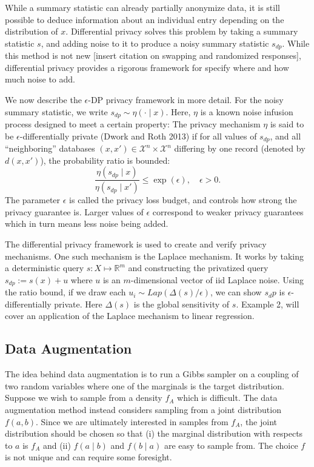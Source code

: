 While a summary statistic can already partially anonymize data, it is still
possible to deduce information about an individual entry depending on
the distribution of \(x\). Differential privacy
solves this problem by taking a summary statistic \(s\), and adding noise to it to produce a noisy summary statistic \(s_{dp}\).
While this method is not new {[}insert citation on swapping and randomized responses{]}, differential privacy
provides a rigorous framework for specify where and how much
noise to add.

We now describe the \(\epsilon\)-DP privacy framework in more detail. For the noisy summary
statistic, we write \(s_{dp} \sim \eta(\cdot \mid x)\). Here,
\(\eta\) is a known noise infusion process designed to meet a certain property: The privacy mechanism
\(\eta\) is said to be \(\epsilon\)-differentially private (Dwork and Roth 2013) if for all values of
\(s_{dp}\), and all ``neighboring'' databases \((x,x') \in \mathcal{X}^n \times \mathcal{X}^n\) differing
by one record (denoted by \(d(x,x')\)), the probability ratio is bounded:
\[
\dfrac{\eta(s_{dp} \mid x)}{\eta(s_{dp} \mid x')} \leq \exp(\epsilon), \quad \epsilon > 0.
\]
The parameter \(\epsilon\) is called the privacy loss budget, and controls how
strong the privacy guarantee is. Larger values of \(\epsilon\) correspond to weaker
privacy guarantees which in turn means less noise being added.

The differential privacy framework is used to create and verify privacy
mechanisms. One such mechanism is the Laplace mechanism. It works by
taking a deterministic query \(s: X \mapsto \mathbb{R}^m\) and constructing
the privatized query \(s_{dp} := s(x) + u\) where \(u\) is an \(m\)-dimensional
vector of iid Laplace noise. Using the ratio bound, if we draw
each \(u_i \sim Lap(\Delta (s) / \epsilon)\), we can show \(s_dp\) is \(\epsilon\)-differentially private.
Here \(\Delta (s)\) is the global sensitivity of \(s\). Example 2, will cover an
application of the Laplace mechanism to linear regression.

\hypertarget{data-augmentation}{%
\subsection{Data Augmentation}\label{data-augmentation}}

The idea behind data augmentation is to run a Gibbs sampler on a coupling of two random variables where one
of the marginals is the target distribution. Suppose we wish to sample from a density \(f_{A}\) which is difficult.
The data augmentation method instead considers sampling from a joint distribution \(f(a,b)\). Since
we are ultimately interested in samples from \(f_A\), the joint
distribution should be chosen so that (i) the marginal distribution
with respects to \(a\) is \(f_{A}\) and (ii) \(f(a \mid b)\) and \(f(b \mid a)\)
are easy to sample from. The choice \(f\) is not unique and can require
some foresight.

